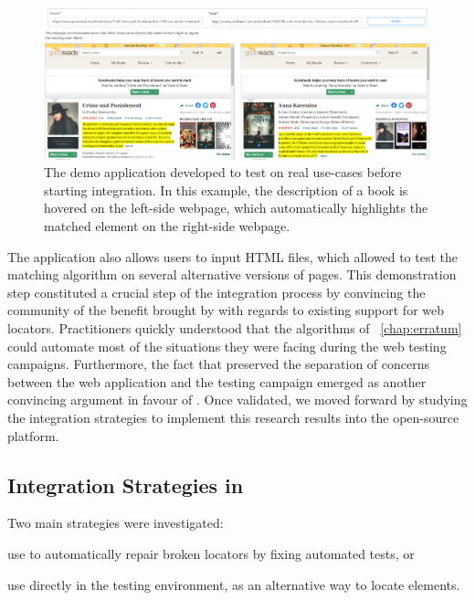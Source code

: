 \begin{figure}[]
    \centering
    \includegraphics[width=\linewidth]{cerberus/explanations/demo_matching}
    \caption{The demo application developed to test \erratum on real use-cases before starting integration. In this example, the description of a book is hovered on the left-side webpage, which automatically highlights the matched element on the right-side webpage.}
    \label{fig:demo_app}
\end{figure}

The application also allows users to input HTML files, which allowed to test the matching algorithm on several alternative versions of pages.
This demonstration step constituted a crucial step of the integration process by convincing the \cerberus community of the benefit brought by \erratum with regards to existing support for web locators.
Practitioners quickly understood that the algorithms of \erratum~\ref{chap:erratum} could automate most of the situations they were facing during the web testing campaigns.
Furthermore, the fact that \erratum preserved the separation of concerns between the web application and the testing campaign emerged as another convincing argument in favour of \erratum.
Once validated, we moved forward by studying the integration strategies to implement this research results into the open-source platform.

\subsection{Integration Strategies in \cerberus}
Two main strategies were investigated:
\begin{inparaenum}[\em (i)]
\item use \erratum to automatically repair broken locators by fixing automated tests, or
\item use \erratum directly in the \cerberus testing environment, as an alternative way to locate elements.
\end{inparaenum}

